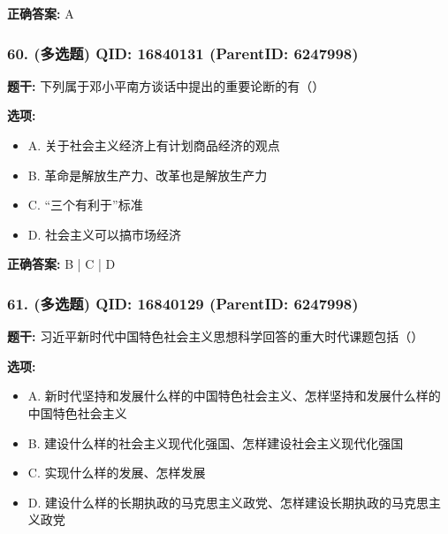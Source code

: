 \documentclass[12pt,UTF8]{ctexart}
\begin{document}
\textbf{正确答案:}
A

\vspace{0.3em}\hrulefill\vspace{0.7em}

\subsubsection*{60. (多选题) \small QID: 16840131 (ParentID: 6247998)}

\textbf{题干:}
下列属于邓小平南方谈话中提出的重要论断的有（）



\textbf{选项:}
\begin{itemize}[leftmargin=*]

  \item A. 关于社会主义经济上有计划商品经济的观点

  \item B. 革命是解放生产力、改革也是解放生产力

  \item C. “三个有利于”标准

  \item D. 社会主义可以搞市场经济

\end{itemize}

\textbf{正确答案:}
B | C | D

\vspace{0.3em}\hrulefill\vspace{0.7em}

\subsubsection*{61. (多选题) \small QID: 16840129 (ParentID: 6247998)}

\textbf{题干:}
习近平新时代中国特色社会主义思想科学回答的重大时代课题包括（）



\textbf{选项:}
\begin{itemize}[leftmargin=*]

  \item A. 新时代坚持和发展什么样的中国特色社会主义、怎样坚持和发展什么样的中国特色社会主义

  \item B. 建设什么样的社会主义现代化强国、怎样建设社会主义现代化强国

  \item C. 实现什么样的发展、怎样发展

  \item D. 建设什么样的长期执政的马克思主义政党、怎样建设长期执政的马克思主义政党

\end{itemize}
\end{document}
